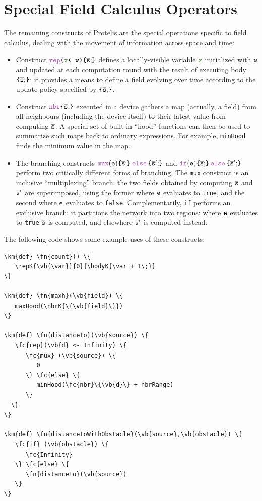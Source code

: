 \documentclass[12pt,a4paper,twoside,openright]{book}
\begin{document}
\section{Special Field Calculus Operators}
\label{protelis-special-operators}
The remaining constructs of Protelis are the special operations specific to field calculus, dealing with the movement of information across space and time:
\begin{itemize}
	\item Construct $\repK{\vb{\var}}{\we}{\bodyK{\overline{\s};}}$ defines a locally-visible variable $\vb{\var}$ initialized with $\texttt{w}$ and updated at each computation round with the result of executing body $\bodyK{\overline{\s};}$: it provides a means to define a field evolving over time according to the update policy specified by $\bodyK{\overline{\s};}$.
%
	\item Construct $\nbrK{\bodyK{\overline{\s};}}$ executed in a device gathers a map (actually, a field) from all neighbours (including the device itself) to their latest value from computing $\overline{\texttt{s}}$. A special set of built-in ``hood'' functions can then be used to summarize such maps back to ordinary expressions.
	For example, {\tt minHood} finds the minimum value in the map.
%
  \item The branching constructs $\muxK{\e}{\bodyK{\overline{\s};}}{\bodyK{\overline{\s}';}}$ and $\ifK{\e}{\bodyK{\overline{\s};}}{\bodyK{\overline{\s}';}}$ perform two critically different forms of branching.
%
	The {\tt mux} construct is an inclusive ``multiplexing'' branch: the two fields obtained by computing $\overline{\texttt{s}}$ and $\overline{\texttt{s}}'$ are superimposed, using the former where $\texttt{e}$ evaluates to \texttt{true}, and the second where $\texttt{e}$ evaluates to \texttt{false}.
%
	Complementarily, {\tt if} performs an exclusive branch: it partitions the network into two regions: where $\texttt{e}$ evaluates to \texttt{true} $\overline{\texttt{s}}$ is computed, and elsewhere $\overline{\texttt{s}}'$ is computed instead.
\end{itemize}

The following code shows some example uses of these constructs:

\begin{Verbatim}[samepage=true,frame=single, commandchars=\\\{\}]
\km{def} \fn{count}() \{
   \repK{\vb{\var}}{0}{\bodyK{\var + 1\;}}
\}

\km{def} \fn{maxh}(\vb{field}) \{
   maxHood(\nbrK{\{\vb{field}\}})
\}

\km{def} \fn{distanceTo}(\vb{source}) \{
   \fc{rep}(\vb{d} <- Infinity) \{
      \fc{mux} (\vb{source}) \{
         0
      \} \fc{else} \{
         minHood(\fc{nbr}\{\vb{d}\} + nbrRange)
      \}
  \}
\}

\km{def} \fn{distanceToWithObstacle}(\vb{source},\vb{obstacle}) \{
   \fc{if} (\vb{obstacle}) \{
      \fc{Infinity}
   \} \fc{else} \{
      \fn{distanceTo}(\vb{source})
   \}
\}
\end{Verbatim}
\end{document}
